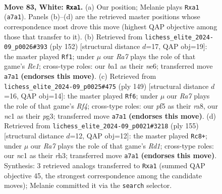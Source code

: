 \documentclass[11pt]{article}
\begin{document}
\clearpage

\begin{figure}[p]\centering
\begin{subfigure}{0.46\textwidth}\centering
\resizebox{\linewidth}{!}{%
\newchessgame
\chessboard[
  setfen={8/R6P/4k1p1/5p2/5P2/5K2/8/b1n5 w - - 0 83},
  showmover=false,
  pgfstyle=straightmove, color=movearrow, markmove={a7-a1}
]}
\caption{}
\end{subfigure}\hfill
\begin{subfigure}{0.46\textwidth}\centering
\resizebox{\linewidth}{!}{%
\newchessgame
\chessboard[
  setfen={8/8/4nk2/5p1p/7P/6P1/6K1/4R3 w - - 28 77},
  showmover=false,
  pgfstyle=straightmove, color=movearrow, markmove={e1-f1}
]}
\caption{}
\end{subfigure}
\\[4pt]
\begin{subfigure}{0.46\textwidth}\centering
\resizebox{\linewidth}{!}{%
\newchessgame
\chessboard[
  setfen={R7/6k1/8/5r1p/6p1/6P1/5P2/6K1 b - - 43 75},
  showmover=false,
  pgfstyle=straightmove, color=movearrow, markmove={f5-f6}
]}
\caption{}
\end{subfigure}\hfill
\begin{subfigure}{0.46\textwidth}\centering
\resizebox{\linewidth}{!}{%
\newchessgame
\chessboard[
  setfen={3r4/6k1/5p2/2KB1Pp1/6P1/7R/8/8 b - - 0 78},
  showmover=false,
  pgfstyle=straightmove, color=movearrow, markmove={d8-c8}
]}
\caption{}
\end{subfigure}
\caption{\textbf{Move 83, White: \texttt{Rxa1}.} (a) Our position; Melanie plays \texttt{Rxa1} (\texttt{a7a1}). Panels (b)--(d) are the retrieved master positions whose correspondence most drove this move (highest QAP objective among those that transfer to it). (b) Retrieved from \texttt{lichess\_elite\_2024-09\_p0026\#393} (ply 152) [structural distance $d$=17, QAP obj=19]: the master played \texttt{Rf1}; under $\mu$ our \emph{Ra7} plays the role of that game's \emph{Re1}; cross-type roles: our \emph{b}a1 as their \emph{n}e6; transferred move \texttt{a7a1} \textbf{(endorses this move)}. (c) Retrieved from \texttt{lichess\_elite\_2024-09\_p0025\#475} (ply 149) [structural distance $d$=16, QAP obj=14]: the master played \texttt{Rf6}; under $\mu$ our \emph{Ra7} plays the role of that game's \emph{Rf4}; cross-type roles: our \emph{p}f5 as their \emph{r}a8, our \emph{n}c1 as their \emph{p}g3; transferred move \texttt{a7a1} \textbf{(endorses this move)}. (d) Retrieved from \texttt{lichess\_elite\_2024-09\_p0021\#3218} (ply 155) [structural distance $d$=12, QAP obj=12]: the master played \texttt{Rc8+}; under $\mu$ our \emph{Ra7} plays the role of that game's \emph{Rd1}; cross-type roles: our \emph{n}c1 as their \emph{r}h3; transferred move \texttt{a7a1} \textbf{(endorses this move)}. Synthesis: 3 retrieved analogs transferred to \texttt{Rxa1} (summed QAP objective 45, the strongest correspondence among the candidate moves); Melanie committed it via the \texttt{search} selector.}
\label{fig:thought-m164}
\end{figure}
\end{document}
